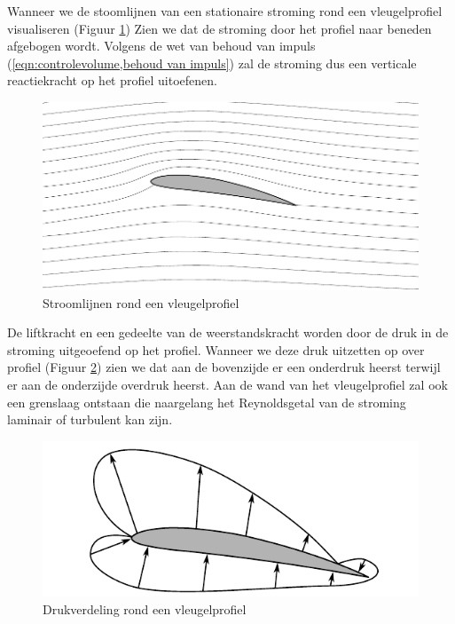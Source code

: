 Wanneer we de stoomlijnen van een stationaire stroming rond een vleugelprofiel visualiseren (Figuur \ref{fig:vleugelprofiel stroomlijnen}) Zien we dat de stroming door het profiel naar beneden afgebogen wordt. Volgens de wet van behoud van impuls (\ref{eqn:controlevolume,behoud van impuls}) zal de stroming dus een verticale reactiekracht op het profiel uitoefenen.
\begin{figure}[htb]
	\centering
	\includegraphics{fig/uitwendige_stroming/vleugelprofiel_stroomlijnen}
	\caption{Stroomlijnen rond een vleugelprofiel}
	\label{fig:vleugelprofiel stroomlijnen}
\end{figure}
De liftkracht en een gedeelte van de weerstandskracht worden door de druk in de stroming uitgeoefend op het profiel. Wanneer we deze druk uitzetten op over profiel (Figuur \ref{fig:vleugelprofiel drukverdeling}) zien we dat aan de bovenzijde er een onderdruk heerst terwijl er aan de onderzijde overdruk heerst. Aan de wand van het vleugelprofiel zal ook een grenslaag ontstaan die naargelang het Reynoldsgetal van de stroming laminair of turbulent kan zijn.
\begin{figure}[htb]
	\centering
	\includegraphics{fig/uitwendige_stroming/vleugelprofiel_drukverdeling}
	\caption{Drukverdeling rond een vleugelprofiel}
	\label{fig:vleugelprofiel drukverdeling}
\end{figure}


